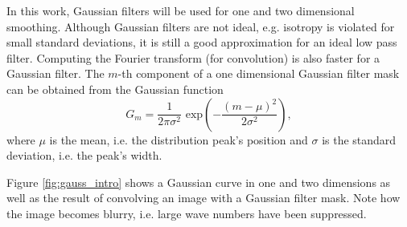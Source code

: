 		In this work, Gaussian filters will be used for one and two dimensional smoothing. Although Gaussian filters are not ideal, e.g. isotropy is violated for small standard deviations, it is still a good approximation for an ideal low pass filter. Computing the Fourier transform (for convolution) is also faster for a Gaussian filter. The $m$-th component of a one dimensional Gaussian filter mask can be obtained from the Gaussian function
		\begin{equation}
		G_{m} = \dfrac{1}{2 \pi \sigma^2} \text{ exp}
			 \left( 
			 	- \dfrac{(m-\mu)^2}{2 \sigma^2}
			 \right),
		\end{equation}
		where $\mu$ is the mean, i.e. the distribution peak's position and $\sigma$ is the standard deviation, i.e. the peak's width.
		
		Figure \ref{fig:gauss_intro} shows a Gaussian curve in one and two dimensions as well as the result of convolving an image with a Gaussian filter mask. Note how the image becomes blurry, i.e. large wave numbers have been suppressed.
